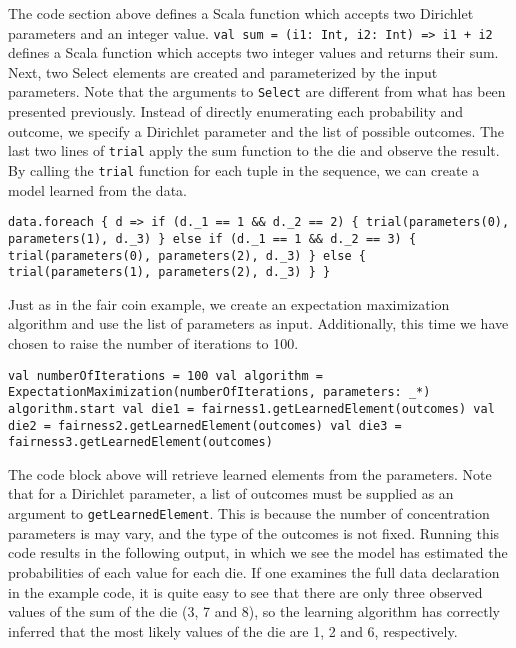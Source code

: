 The code section above defines a Scala function which accepts two Dirichlet parameters and an integer value. \texttt{val sum = (i1: Int, i2: Int) => i1 + i2} defines a Scala function which accepts two integer values and returns their sum.  Next, two Select elements are created and parameterized by the input parameters. Note that the arguments to \texttt{Select} are different from what has been presented previously. Instead of directly enumerating each probability and outcome, we specify a Dirichlet parameter and the list of possible outcomes. The last two lines of \texttt{trial} apply the sum function to the die and observe the result. By calling the \texttt{trial} function for each tuple in the sequence, we can create a model learned from the data.

\begin{flushleft}
\texttt{data.foreach \{ d =>
\newline if (d.\_1 == 1 \&\& d.\_2 == 2) \{
\newline \tab trial(parameters(0), parameters(1), d.\_3)
\newline \tab \} else if (d.\_1 == 1 \&\& d.\_2 == 3) \{
\newline \tab trial(parameters(0), parameters(2), d.\_3)
\newline \} else \{
\newline \tab trial(parameters(1), parameters(2), d.\_3)
\newline \}
\newline \}
}
\end{flushleft}

Just as in the fair coin example, we create an expectation maximization algorithm and use the list of parameters as input. Additionally, this time we have chosen to raise the number of iterations to 100.

\begin{flushleft}
\texttt{val numberOfIterations = 100
\newline val algorithm = ExpectationMaximization(numberOfIterations, parameters: \_*)
\newline algorithm.start
\newline 
\newline val die1 = fairness1.getLearnedElement(outcomes) 
\newline val die2 = fairness2.getLearnedElement(outcomes) 
\newline val die3 = fairness3.getLearnedElement(outcomes)
}
\end{flushleft}

The code block above will retrieve learned elements from the parameters. Note that for a Dirichlet parameter, a list of outcomes must be supplied as an argument to \texttt{getLearnedElement}. This is because the number of concentration parameters is may vary, and the type of the outcomes is not fixed. Running this code results in the following output, in which we see the model has estimated the probabilities of each value for each die. If one examines the full data declaration in the example code, it is quite easy to see that there are only three observed values of the sum of the die (3, 7 and 8), so the learning algorithm has correctly inferred that the most likely values of the die are 1, 2 and 6, respectively.

